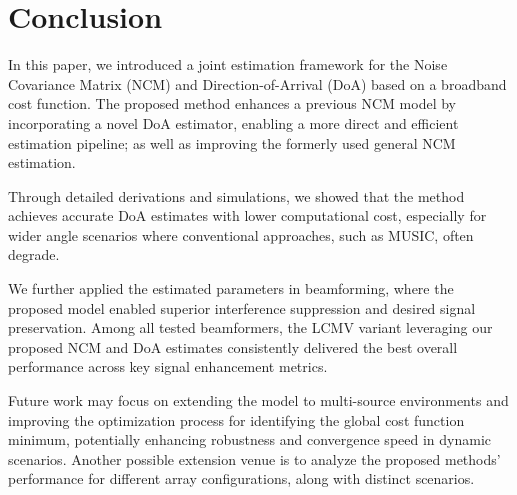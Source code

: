 \section{Conclusion}
\label{sec:conclusion}
In this paper, we introduced a joint estimation framework for the Noise Covariance Matrix (NCM) and Direction-of-Arrival (DoA) based on a broadband cost function. The proposed method enhances a previous NCM model by incorporating a novel DoA estimator, enabling a more direct and efficient estimation pipeline; as well as improving the formerly used general NCM estimation.

Through detailed derivations and simulations, we showed that the method achieves accurate DoA estimates with lower computational cost, especially for wider angle scenarios where conventional approaches, such as MUSIC, often degrade.

We further applied the estimated parameters in beamforming, where the proposed model enabled superior interference suppression and desired signal preservation. Among all tested beamformers, the LCMV variant leveraging our proposed NCM and DoA estimates consistently delivered the best overall performance across key signal enhancement metrics.

Future work may focus on extending the model to multi-source environments and improving the optimization process for identifying the global cost function minimum, potentially enhancing robustness and convergence speed in dynamic scenarios. Another possible extension venue is to analyze the proposed methods' performance for different array configurations, along with distinct scenarios.

